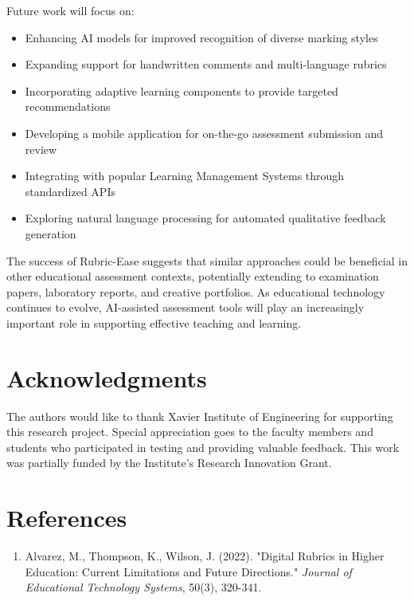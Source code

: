 \documentclass[12pt]{article}
\begin{document}

Future work will focus on:
\begin{itemize}
    \item Enhancing AI models for improved recognition of diverse marking styles
    \item Expanding support for handwritten comments and multi-language rubrics
    \item Incorporating adaptive learning components to provide targeted recommendations
    \item Developing a mobile application for on-the-go assessment submission and review
    \item Integrating with popular Learning Management Systems through standardized APIs
    \item Exploring natural language processing for automated qualitative feedback generation
\end{itemize}

The success of Rubric-Ease suggests that similar approaches could be beneficial in other educational assessment contexts, potentially extending to examination papers, laboratory reports, and creative portfolios. As educational technology continues to evolve, AI-assisted assessment tools will play an increasingly important role in supporting effective teaching and learning.

\section*{Acknowledgments}
The authors would like to thank Xavier Institute of Engineering for supporting this research project. Special appreciation goes to the faculty members and students who participated in testing and providing valuable feedback. This work was partially funded by the Institute's Research Innovation Grant.

\section*{References}
\begin{enumerate}
    \item Alvarez, M., Thompson, K., Wilson, J. (2022). "Digital Rubrics in Higher Education: Current Limitations and Future Directions." \textit{Journal of Educational Technology Systems}, 50(3), 320-341.
    

\end{enumerate}
\end{document}
\end{itemize}
\end{document}

